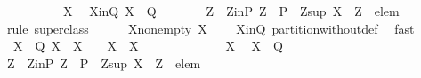 \begin{isabellebody}
\ \ \isamarkupfalse%
\ \isanewline
\ \ \ \ \isamarkupfalse%
\ X{}\ \isamarkupfalse%
\ X{}{\isacharunderscore}in{\isacharunderscore}Q{\isacharcolon}\ {\isachardoublequoteopen}X{}\ {\isasymin}\ {\isacharquery}Q{\isachardoublequoteclose}\isanewline
\ \ \ \ \isamarkupfalse%
\ \isamarkupfalse%
\ Z{}\ \ Z{}{\isacharunderscore}in{\isacharunderscore}P{\isacharcolon}\ {\isachardoublequoteopen}Z{}\ {\isasymin}\ P{\isachardoublequoteclose}\ \ Z{}{\isacharunderscore}sup{\isacharcolon}\ {\isachardoublequoteopen}X{}\ {\isacharequal}\ Z{}\ {\isacharminus}\ {\isacharbraceleft}elem{\isacharbraceright}{\isachardoublequoteclose}\isanewline
\ \ \ \ \ \ \isamarkupfalse%
\ {\isacharparenleft}rule\ super{\isacharunderscore}class{\isacharparenright}\isanewline
\ \ \ \ \isamarkupfalse%
\ X{}{\isacharunderscore}non{\isacharunderscore}empty{\isacharcolon}\ {\isachardoublequoteopen}X{}\ {\isasymnoteq}\ {\isacharbraceleft}{\isacharbraceright}{\isachardoublequoteclose}\ \isamarkupfalse%
\ X{}{\isacharunderscore}in{\isacharunderscore}Q\ partition{\isacharunderscore}without{\isacharunderscore}def\ \isamarkupfalse%
\ fast\isanewline
\ \ \ \ \isamarkupfalse%
\ {\isachardoublequoteopen}{\isasymforall}\ X{}\ {\isasymin}\ {\isacharquery}Q{\isachardot}\ X{}\ {\isasyminter}\ X{}\ {\isasymnoteq}\ {\isacharbraceleft}{\isacharbraceright}\ {\isasymlongleftrightarrow}\ X{}\ {\isacharequal}\ X{}{\isachardoublequoteclose}\ \isanewline
\ \ \ \ \isamarkupfalse%
\isanewline
\ \ \ \ \ \ \isamarkupfalse%
\ X{}\ \isamarkupfalse%
\ {\isachardoublequoteopen}X{}\ {\isasymin}\ {\isacharquery}Q{\isachardoublequoteclose}\isanewline
\ \ \ \ \ \ \isamarkupfalse%
\ \isamarkupfalse%
\ Z{}\ \ Z{}{\isacharunderscore}in{\isacharunderscore}P{\isacharcolon}\ {\isachardoublequoteopen}Z{}\ {\isasymin}\ P{\isachardoublequoteclose}\ \ Z{}{\isacharunderscore}sup{\isacharcolon}\ {\isachardoublequoteopen}X{}\ {\isacharequal}\ Z{}\ {\isacharminus}\ {\isacharbraceleft}elem{\isacharbraceright}{\isachardoublequoteclose}\isanewline

\end{isabellebody}
